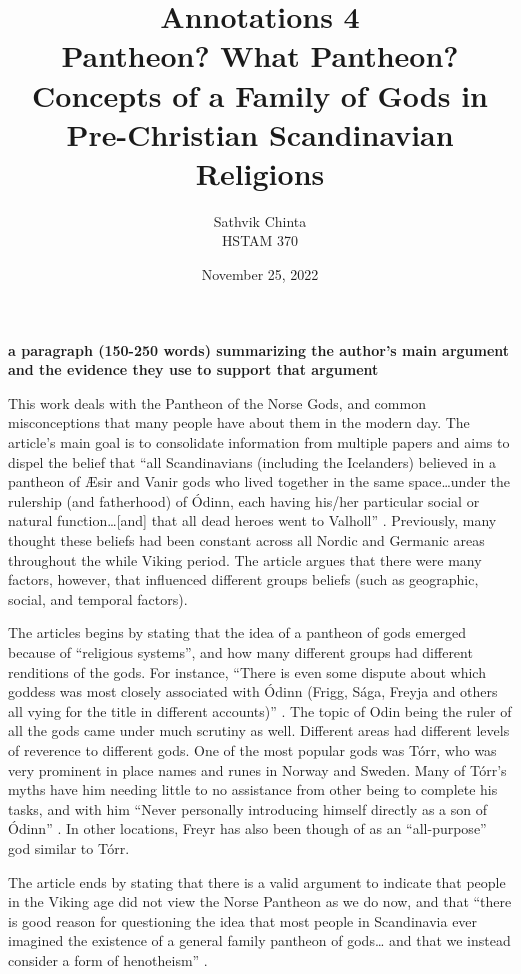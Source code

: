 \documentclass[a4paper]{article}
\title {
	Annotations 4\\ Pantheon? What Pantheon? Concepts of a Family of Gods in Pre-Christian Scandinavian Religions
}
\author {
	\normalsize Sathvik Chinta\\\normalsize
    \normalsize HSTAM 370\\\normalsize
}
\date {
	\color{black} November 25, 2022
}
\begin{document}
 \maketitle

        \textbf{a paragraph (150-250 words) summarizing the author's main argument and the evidence they use to support that argument}
        
        This work deals with the Pantheon of the Norse Gods, and common misconceptions that many people have about them in the modern day. 
        The article’s main goal is to consolidate information from multiple papers and aims to dispel the belief that “all Scandinavians 
        (including the Icelanders) believed in a pantheon of Æsir and Vanir gods who lived together in the same space…under the rulership 
        (and fatherhood) of Ódinn, each having his/her particular social or natural function…[and] that all dead heroes went to Valholl” 
        \citep[p.55]{TGunn}. Previously, many thought these beliefs had been constant across all Nordic and Germanic areas throughout 
        the while Viking period. The article argues that there were many factors, however, that influenced different groups beliefs 
        (such as geographic, social, and temporal factors).

        The articles begins by stating that the idea of a pantheon of gods emerged because of “religious systems”, and how many different 
        groups had different renditions of the gods. For instance, “There is even some dispute about which goddess was most closely 
        associated with Ódinn (Frigg, Sága, Freyja and others all vying for the title in different accounts)” \citep[p.57]{TGunn}. 
        The topic of Odin being the ruler of all the gods came under much scrutiny as well. Different areas had different levels of 
        reverence to different gods. One of the most popular gods was Tórr,  who was very prominent in place names and runes in Norway 
        and Sweden. Many of Tórr’s myths have him needing little to no assistance from other being to complete his tasks, and with 
        him “Never personally introducing himself directly as a son of Ódinn” \citep[p.65]{TGunn}. In other locations, Freyr has 
        also been though of as an “all-purpose” god similar to Tórr.

        The article ends by stating that there is a valid argument to indicate that people in the Viking age did not view the Norse 
        Pantheon as we do now, and that “there is good reason for questioning the idea that most people in Scandinavia ever imagined 
        the existence of a general family pantheon of gods… and that we instead consider a form of henotheism” \citep[p.69]{TGunn}.
\end{document}
